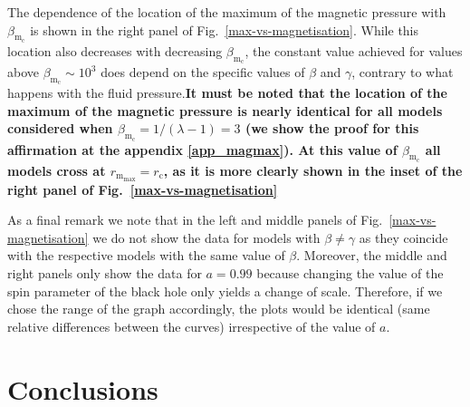 \documentclass[]{aa}
\begin{document}
The dependence of the location of the maximum of the magnetic pressure with $\beta_{\mathrm{m}_{\mathrm{c}}}$ is shown in the right panel of Fig.~\ref{max-vs-magnetisation}. While this location also decreases with decreasing $\beta_{\mathrm{m}_{\mathrm{c}}}$, the constant value achieved for values above $\beta_{\mathrm{m}_{\mathrm{c}}}\sim 10^{3}$ does depend on the specific values of $\beta$ and $\gamma$, contrary to what happens with the fluid pressure.{\bf It must be noted that the location of the maximum of the magnetic pressure is nearly identical for all models considered when $\beta_{\mathrm{m}_{\mathrm{c}}} = 1/(\lambda - 1) = 3$ (we show the proof for this affirmation at the appendix \ref{app_magmax}). At this value of $\beta_{\mathrm{m}_{\mathrm{c}}}$ all models cross at $r_{\mathrm{m}_{\mathrm{max}}} = r_{\mathrm{c}}$, as it is more clearly shown in the inset of the right panel of Fig.~\ref{max-vs-magnetisation}} 

As a final remark we note that in the left and middle panels of Fig.~\ref{max-vs-magnetisation} we do not show the data for models with $\beta \neq \gamma$ as they coincide with the respective models with the same value of $\beta$. Moreover, the middle and right panels only show the data for $a=0.99$ because changing the value of the spin parameter of the black hole only yields a change of scale. Therefore, if we chose the range of the graph accordingly, the plots would be identical (same relative differences between the curves) irrespective of the value of $a$.

\section{Conclusions}
\label{conclusions}
\end{document}
